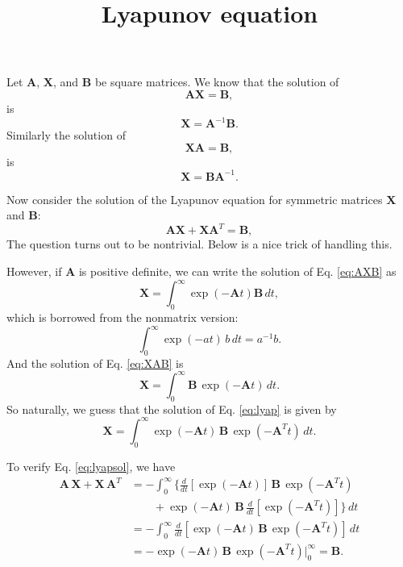 \documentclass{article}
\begin{document}
\title{Lyapunov equation}
\author{ \vspace{-10ex} }
\date{ \vspace{-10ex} }
\maketitle

Let $\mathbf A$, $\mathbf X$, and $\mathbf B$ be square matrices.
We know that the solution of
\begin{equation}
\mathbf A \mathbf X = \mathbf B,
\label{eq:AXB}
\end{equation}
is
$$
\mathbf X = \mathbf A^{-1} \mathbf B.
$$
Similarly the solution of
\begin{equation}
\mathbf X \mathbf A = \mathbf B,
\label{eq:XAB}
\end{equation}
is
$$
\mathbf X = \mathbf B \mathbf A^{-1}.
$$

Now consider the solution of the Lyapunov equation
for symmetric matrices $\mathbf X$ and $\mathbf B$:
\begin{equation}
\mathbf A \mathbf X + \mathbf X \mathbf A^T = \mathbf B,
\label{eq:lyap}
\end{equation}
The question turns out to be nontrivial.
Below is a nice trick of handling this.

However, if $\mathbf A$ is positive definite,
we can write the solution of Eq. \eqref{eq:AXB} as
$$
\mathbf X = \int_0^\infty \exp(-\mathbf A t) \mathbf B \, dt,
$$
which is borrowed from the nonmatrix version:
$$
\int_0^\infty \exp(-at) \, b \, dt  = a^{-1} b.
$$
And the solution of Eq. \eqref{eq:XAB} is
$$
\mathbf X = \int_0^\infty \mathbf B \, \exp(-\mathbf A t) \, dt.
$$
So naturally, we guess that the solution of Eq. \eqref{eq:lyap} is
given by
\begin{equation}
\mathbf X =
\int_0^\infty
\exp(-\mathbf A t) \, \mathbf B \, \exp(-\mathbf A^T t) \, dt.
\label{eq:lyapsol}
\end{equation}

To verify Eq. \eqref{eq:lyapsol},
we have
$$
\begin{aligned}
\mathbf A \, \mathbf X + \mathbf X \, \mathbf A^T
&=
-\int_0^\infty
\Big\{
\frac{d}{dt}[ \exp(-\mathbf A t) ] \, \mathbf B \, \exp(-\mathbf A^T t)
\\
&\qquad +
\exp(-\mathbf A t) \, \mathbf B \, \frac{d}{dt}[\exp(-\mathbf A^T t) ]
\Big\}
 \, dt \\
&=
-\int_0^\infty
\frac{d}{dt}[ \exp(-\mathbf A t) \, \mathbf B \, \exp(-\mathbf A^T t) ]
 \, dt \\
&=
-\exp(-\mathbf A t) \, \mathbf B \, \exp(-\mathbf A^T t) \Big|_0^\infty
= \mathbf B.
\end{aligned}
$$
\end{document}
